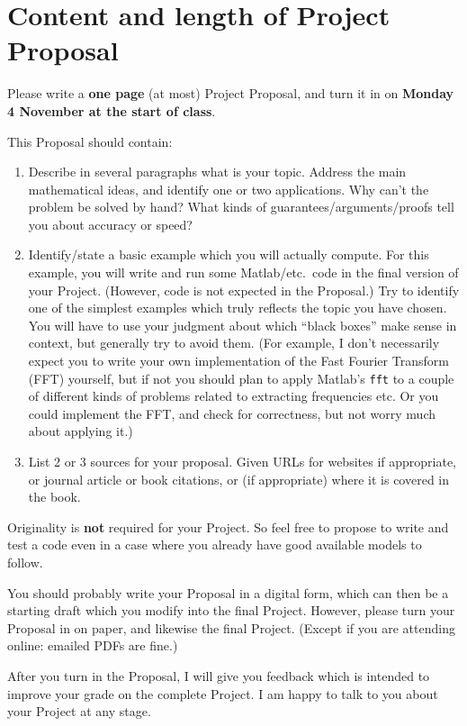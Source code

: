 \documentclass[11pt]{amsart}
\begin{document}
\section*{Content and length of Project Proposal}   

Please write a \textbf{one page} (at most) Project Proposal, and turn it in on \textbf{Monday 4 November at the start of class}.

This Proposal should contain:
\begin{enumerate}
\item Describe in several paragraphs what is your topic.  Address the main mathematical ideas, and identify one or two applications.  Why can't the problem be solved by hand?  What kinds of guarantees/arguments/proofs tell you about accuracy or speed?
\item Identify/state a basic example which you will actually compute.  For this example, you will write and run some Matlab/etc.~code in the final version of your Project.  (However, code is not expected in the Proposal.)  Try to identify one of the simplest examples which truly reflects the topic you have chosen.  You will have to use your judgment about which ``black boxes'' make sense in context, but generally try to avoid them.  (For example, I don't necessarily expect you to write your own implementation of the Fast Fourier Transform (FFT) yourself, but if not you should plan to apply Matlab's \texttt{fft} to a couple of different kinds of problems related to extracting frequencies etc.  Or you could implement the FFT, and check for correctness, but not worry much about applying it.)
\item List 2 or 3 sources for your proposal.  Given URLs for websites if appropriate, or journal article or book citations, or (if appropriate) where it is covered in the book.
\end{enumerate}

Originality is \textbf{not} required for your Project.  So feel free to propose to write and test a code even in a case where you already have good available models to follow.

You should probably write your Proposal in a digital form, which can then be a starting draft which you modify into the final Project.  However, please turn your Proposal in on paper, and likewise the final Project.  (Except if you are attending online: emailed PDFs are fine.)

After you turn in the Proposal, I will give you feedback which is intended to improve your grade on the complete Project.  I am happy to talk to you about your Project at any stage.
\end{document}
